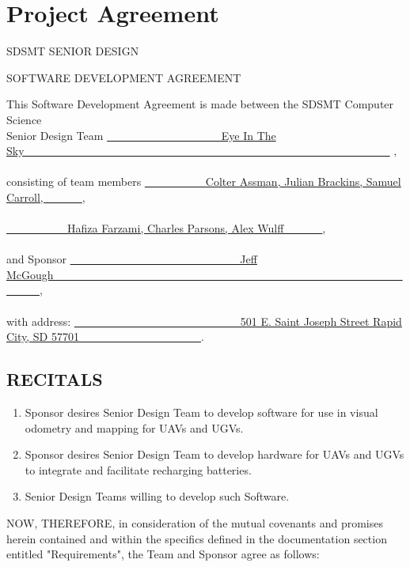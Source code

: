 \chapter{Project Agreement}

{\Large \bf 
\centerline{SDSMT SENIOR DESIGN}\centerline{SOFTWARE DEVELOPMENT AGREEMENT}
}
\vspace{\baselineskip}

This Software Development Agreement is made between the SDSMT  Computer Science\\[3mm] Senior Design Team \underline{~~~~~~~~~~~~~~~~~~~~ Eye In The Sky~~~~~~~~~~~~~~~~~~~~~~~~~~~~~~~~~~~~~~~~~~~~~~~~~~~~~~~~~~~~~~~~~~} \hrulefill, \\[-1mm]  \hspace*{9cm} {\footnotesize }\\[3mm]
consisting of team members  \underline{~~~~~~~~~~~Colter Assman, Julian Brackins, Samuel Carroll,~~~~~~~}\hrulefill,  \\[-1mm]  \hspace*{9cm} {\footnotesize }\\[3mm]
  \underline{~~~~~~~~~~~Hafiza Farzami, Charles Parsons, Alex Wulff~~~~~~~}\hrulefill,  \\[-1mm]  \hspace*{9cm} {\footnotesize }\\[3mm]
 and  Sponsor \underline{~~~~~~~~~~~~~~~~~~~~~~~~~~~~~~ Jeff McGough~~~~~~~~~~~~~~~~~~~~~~~~~~~~~~~~~~~~~~~~~~~~~~~~~~~~~~~~~~~~~~~~~~~~~}\hrulefill,  \\[-1mm]  \hspace*{9cm}{\footnotesize  } \\[3mm]
 with address: \underline{~~~~~~~~~~~~~~~~~~~~~~~~~~~~~~501 E. Saint Joseph Street Rapid City, SD 57701~~~~~~~~~~~~~~~~~~~~~~}\hrulefill . 

\vspace{4mm}


\section{RECITALS}
\begin{enumerate}  \itemsep4pt \parskip0pt 
\item Sponsor desires Senior Design Team to develop software for use in visual odometry and mapping for UAVs and UGVs.    
\item Sponsor desires Senior Design Team to develop hardware for UAVs and UGVs to integrate and facilitate recharging batteries.
\item Senior Design Teams willing to develop such Software.  
\end{enumerate}
NOW, THEREFORE, in consideration of the mutual covenants and promises herein contained and within the specifics defined in the documentation section entitled "Requirements", the Team and Sponsor agree as follows:  

